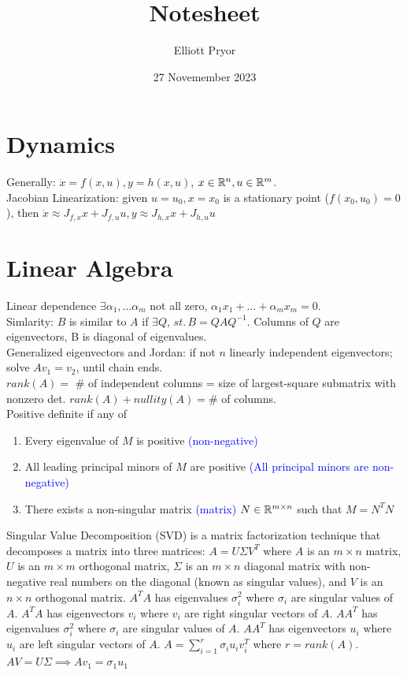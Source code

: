 \documentclass[11pt]{article}
\title{Notesheet}
\author{Elliott Pryor}
\date{27 Novemember 2023}
\begin{document}

\section{Dynamics}
Generally: $\dot{x} = f(x,u), y = h(x,u)$, $x \in \mathbb{R}^n, u \in \mathbb{R}^m$.\\
Jacobian Linearization: given $u = u_0, x=x_0$ is a stationary point ($f(x_0, u_0) = 0$),
then $\dot{x} \approx J_{f,x}x + J_{f,u}u, y \approx J_{h,x}x + J_{h,u}u$ \\

\section{Linear Algebra}
Linear dependence $\exists \alpha_1, \dots \alpha_m$ not all zero, $\alpha_1 x_1 + \dots + \alpha_m x_m = 0$.\\
Simlarity: $B$ is similar to $A$ if $\exists Q, \, st. \, B = QAQ^{-1}$.
Columns of $Q$ are eigenvectors, B is diagonal of eigenvalues.\\
Generalized eigenvectors and Jordan: if not $n$ linearly independent eigenvectors;
solve $Av_1 = v_2$, until chain ends. \\
$rank(A) = $ \# of independent columns = size of largest-square submatrix with nonzero det.
$rank(A) + nullity(A) = $\# of columns. \\
Positive definite if any of \begin{enumerate}
    \item Every eigenvalue of $M$ is positive \textcolor{blue}{(non-negative)}
    \item All leading principal minors of $M$ are positive \textcolor{blue}{(All principal minors are non-negative)}
    \item There exists a non-singular matrix \textcolor{blue}{(matrix)} $N \in \mathbb{R}^{m\times n}$ such that $M = N^TN$
\end{enumerate}
Singular Value Decomposition (SVD) is a matrix factorization technique that decomposes a matrix into three matrices:
$A = U \Sigma V^T$
where $A$ is an $m \times n$ matrix, $U$ is an $m \times m$ orthogonal matrix, 
$\Sigma$ is an $m \times n$ diagonal matrix with non-negative real numbers on the diagonal (known as singular values),
and $V$ is an $n \times n$ orthogonal matrix.
$A^TA$ has eigenvalues $\sigma_i^2$ where $\sigma_i$ are singular values of $A$.
$A^TA$ has eigenvectors $v_i$ where $v_i$ are right singular vectors of $A$.
$AA^T$ has eigenvalues $\sigma_i^2$ where $\sigma_i$ are singular values of $A$.
$AA^T$ has eigenvectors $u_i$ where $u_i$ are left singular vectors of $A$.
$A = \sum_{i=1}^r \sigma_i u_i v_i^T$ where $r = rank(A)$.
$AV = U\Sigma \implies Av_1 = \sigma_1 u_1$\\
\end{document}
